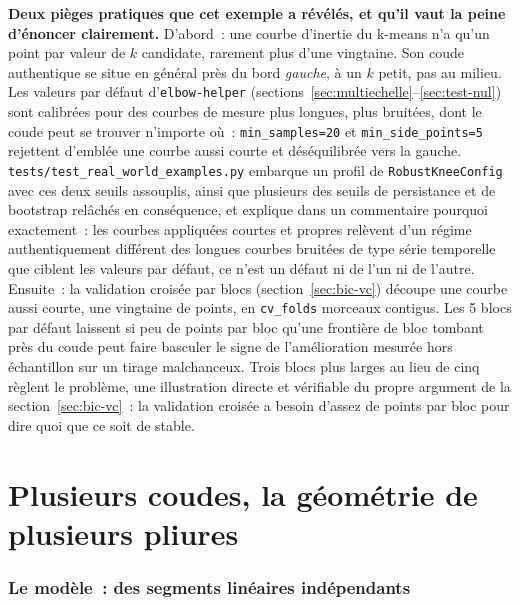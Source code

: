 \documentclass[11pt]{article}
\newcommand{\code}[1]{\texttt{#1}}
\begin{document}
\textbf{Deux pièges pratiques que cet exemple a révélés, et qu'il vaut la
peine d'énoncer clairement.} D'abord~: une courbe d'inertie du k-means n'a
qu'un point par valeur de $k$ candidate, rarement plus d'une vingtaine.
Son coude authentique se situe en général près du bord \emph{gauche}, à un
$k$ petit, pas au milieu. Les valeurs par défaut d'\code{elbow-helper}
(sections~\ref{sec:multiechelle}--\ref{sec:test-nul}) sont calibrées pour
des courbes de mesure plus longues, plus bruitées, dont le coude peut se
trouver n'importe où~: \code{min\_samples=20} et \code{min\_side\_points=5}
rejettent d'emblée une courbe aussi courte et déséquilibrée vers la gauche.
\code{tests/test\_real\_world\_examples.py} embarque un profil de
\code{RobustKneeConfig} avec ces deux seuils assouplis, ainsi que plusieurs
des seuils de persistance et de bootstrap relâchés en conséquence, et
explique dans un commentaire pourquoi exactement~: les courbes appliquées
courtes et propres relèvent d'un régime authentiquement différent des
longues courbes bruitées de type série temporelle que ciblent les valeurs
par défaut, ce n'est un défaut ni de l'un ni de l'autre. Ensuite~: la
validation croisée par blocs (section~\ref{sec:bic-vc}) découpe une courbe
aussi courte, une vingtaine de points, en \code{cv\_folds} morceaux
contigus. Les 5 blocs par défaut laissent si peu de points par bloc
qu'une frontière de bloc tombant près du coude peut faire basculer le signe
de l'amélioration mesurée hors échantillon sur un tirage malchanceux. Trois
blocs plus larges au lieu de cinq règlent le problème, une illustration
directe et vérifiable du propre argument de la section~\ref{sec:bic-vc}~:
la validation croisée a besoin d'assez de points par bloc pour dire quoi
que ce soit de stable.

\part{Plusieurs coudes, la géométrie de plusieurs pliures}
\label{part:plusieurs}

\section{Le modèle~: des segments linéaires indépendants}
\end{document}
